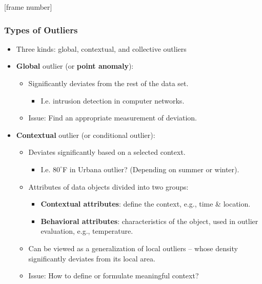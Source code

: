 \documentclass[aspectratio=169,t,xcolor=dvipsnames]{beamer}
\begin{document}
{
  [frame number]
  \begin{frame}
  \frametitle{Types of Outliers}
	\begin{itemize}
	\item Three kinds: global, contextual, and collective outliers
	 \item \textbf{Global} outlier (or \textbf{\color{airforceblue}point anomaly}):
    	\begin{itemize}
    	    \item Significantly deviates from the rest of the data set.
    	    \begin{itemize}
    	        \item I.e. intrusion detection in computer networks.
    	    \end{itemize}
    	    \item Issue: Find an appropriate measurement of deviation.
    	\end{itemize}
    \item \textbf{Contextual} outlier (or conditional outlier):
        \begin{itemize}
            \item Deviates significantly based on a selected context.
                \begin{itemize}
                    \item I.e.  $80^{\circ}$F in Urbana outlier? (Depending on summer or winter).
                \end{itemize}
            \item Attributes of data objects divided into two groups:
                \begin{itemize}
                    \item \textbf{Contextual attributes}: define the context, e.g., time \& location.
                    \item \textbf{Behavioral attributes}: characteristics of the object, used in outlier evaluation, e.g., temperature.
                \end{itemize}
            \item Can be viewed as a generalization of local outliers -- whose density significantly deviates from its local area.
            \item Issue: How to define or formulate meaningful context?
        \end{itemize}
	\end{itemize}


\end{frame}}
\end{document}
